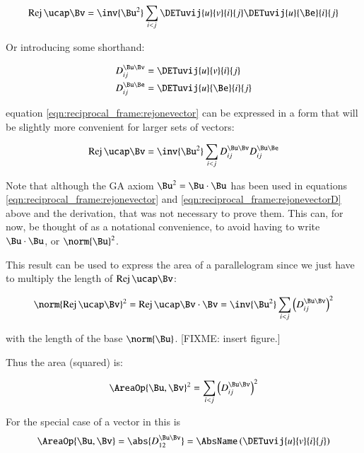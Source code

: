 \begin{equation}\label{eqn:reciprocal_frame:rejonevector}
\Rej{\ucap}{\Bv} = \inv{\Bu^2}\sum_{i<j}\DETuvij{u}{v}{i}{j}\DETuvij{u}{\Be}{i}{j}
\end{equation}

Or introducing some shorthand:

\begin{align*}
D_{ij}^{\Bu \Bv} &= \DETuvij{u}{v}{i}{j} \\
D_{ij}^{\Bu \Be} &= \DETuvij{u}{\Be}{i}{j} \\
\end{align*}

equation \ref{eqn:reciprocal_frame:rejonevector} can be expressed in a form that will be slightly more convenient for larger sets of
vectors:

\begin{equation}\label{eqn:reciprocal_frame:rejonevectorD}
\Rej{\ucap}{\Bv} = \inv{\Bu^2}\sum_{i<j} D_{ij}^{\Bu \Bv} D_{ij}^{\Bu \Be}
\end{equation}

Note that although the GA axiom $\Bu^2 = \Bu \cdot \Bu$ has been used
in equations \ref{eqn:reciprocal_frame:rejonevector} and \ref{eqn:reciprocal_frame:rejonevectorD} above and the derivation, that was
not necessary to prove them.
This can, for now, be thought of as a notational convenience, to avoid having to write $\Bu \cdot \Bu$, or
$\norm{\Bu}^2$.

This result can be used to express the  area of a parallelogram since we just have to multiply the length
of $\Rej{\ucap}{\Bv}$:

\[
\norm{\Rej{\ucap}{\Bv}}^2 = 
\Rej{\ucap}{\Bv} \cdot \Bv =
\inv{\Bu^2}\sum_{i<j} {\left(D_{ij}^{\Bu \Bv}\right)}^2
\]

with the length of the base $\norm{\Bu}$. [FIXME: insert figure.]

Thus the area (squared) is:

\begin{equation}\label{eqn:reciprocal_frame:parallogramarea}
\AreaOp{\Bu,\Bv}^2 = \sum_{i<j} {\left(D_{ij}^{\Bu \Bv}\right)}^2
\end{equation}

For the special case of a vector in  this is
\begin{equation}\label{eqn:reciprocal_frame:parallogramarear2}
\AreaOp{\Bu,\Bv} = \abs{D_{12}^{\Bu \Bv}} = \AbsName\left(\DETuvij{u}{v}{i}{j}\right)
\end{equation}

